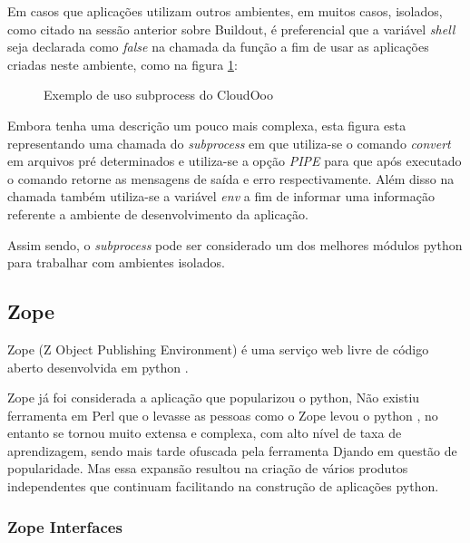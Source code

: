 Em casos que aplicações utilizam outros ambientes, em muitos casos, isolados, como citado na sessão anterior sobre Buildout, é preferencial que a variável \textit{shell} seja declarada como \textit{false} na chamada da função a fim de usar as aplicações criadas neste ambiente, como na figura \ref{subprocess_convert}:

\begin{figure}[ht]
    \centering
    \caption{Exemplo de uso subprocess do CloudOoo}
    \label{subprocess_convert}
\end{figure}

Embora tenha uma descrição um pouco mais complexa, esta figura esta representando uma chamada do \textit{subprocess} em que utiliza-se o comando \textit{convert} em arquivos pré determinados e utiliza-se a opção \textit{PIPE} para que após executado o comando retorne as mensagens de saída e erro respectivamente. Além disso na chamada também utiliza-se a variável \textit{env} a fim de informar uma informação referente a ambiente de desenvolvimento da aplicação.

Assim sendo, o \textit{subprocess} pode ser considerado um dos melhores módulos python para trabalhar com ambientes isolados.

\subsection{Zope}

Zope (Z Object Publishing Environment) é uma serviço web livre de código aberto desenvolvida em python \cite{ZOPE}.

Zope já foi considerada a aplicação que popularizou o python, Não existiu ferramenta em Perl que o levasse as pessoas como o Zope levou o python \cite{UDELL}, no entanto se tornou muito extensa e complexa, com alto nível de taxa de aprendizagem, sendo mais tarde ofuscada pela ferramenta Djando em questão de popularidade. Mas essa expansão resultou na criação de vários produtos independentes que continuam facilitando na construção de aplicações python.

\subsubsection{Zope Interfaces}

